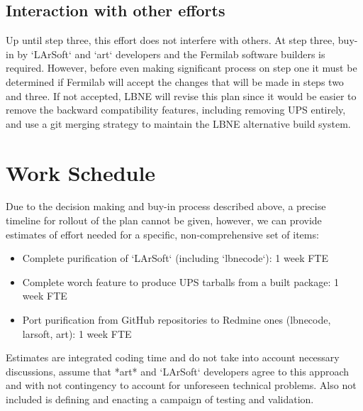 \documentclass[usletter]{article}
\begin{document}
\subsection{Interaction with other efforts}

Up until step three, this effort does not interfere with others. At step
three, buy-in by `LArSoft` and `art` developers and the Fermilab software
builders is required. However, before even making significant process on
step one it must be determined if Fermilab will accept the changes that
will be made in steps two and three. If not accepted, LBNE will revise
this plan  since it would be 
easier to remove the backward compatibility features, including removing UPS entirely, 
and use a git merging strategy to maintain the LBNE alternative build system.

\section{Work Schedule}

Due to the decision making and buy-in process described above, a
precise timeline for rollout of the plan cannot be given, however, we can provide  estimates
of effort needed for a specific, non-comprehensive set of items:
\begin{itemize}
	\item Complete purification of `LArSoft` (including `lbnecode`): 1 week FTE
	\item Complete worch feature to produce UPS tarballs from a built package:
  1 week FTE
	\item Port purification from GitHub repositories to Redmine ones
  (lbnecode, larsoft, art): 1 week FTE
\end{itemize}

Estimates are integrated coding time and do not take into account
necessary discussions, assume that *art* and `LArSoft` developers
agree to this approach and with not contingency to account for
unforeseen technical problems.  Also not included is defining and
enacting a campaign of testing and validation.







\end{document}
